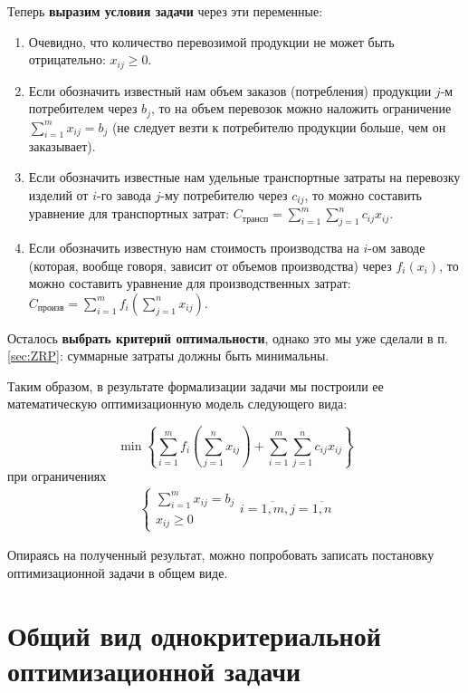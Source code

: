 \documentclass[a4paper,12pt]{report}
\begin{document}
Теперь \textbf{выразим условия задачи} через эти переменные:
\begin{enumerate}
\item Очевидно, что количество перевозимой продукции не может быть отрицательно: $x_{ij}\geq 0$.
\item Если обозначить известный нам объем заказов (потребления) продукции $j$-м потребителем через $b_{j}$, то на объем перевозок можно наложить ограничение $\sum\limits_{i=1}^m x_{ij} = b_{j}$ (не следует везти к потребителю продукции больше, чем он заказывает).
\item Если обозначить известные нам удельные транспортные затраты на перевозку изделий от $i$-го завода $j$-му потребителю через $c_{ij}$, то можно составить уравнение для транспортных затрат: $C_{\text{трансп}} = \sum\limits_{i=1}^m \sum\limits_{j=1}^n c_{ij}x_{ij}$.
\item Если обозначить известную нам стоимость производства на $i$-ом заводе (которая, вообще говоря, зависит от объемов производства) через $f_{i}(x_{i})$, то можно составить уравнение для производственных затрат: $C_{\text{произв}} = \sum\limits_{i=1}^m f_{i}(\sum\limits_{j=1}^n x_{ij})$.
\end{enumerate}
Осталось \textbf{выбрать критерий оптимальности}, однако это мы уже сделали в п. \ref{sec:ZRP}: суммарные затраты должны быть минимальны.

Таким образом, в результате формализации задачи мы построили ее математическую оптимизационную модель следующего вида:

\begin{equation}
\label{eq:num1}
\min \left\{\sum\limits_{i=1}^m f_{i}(\sum\limits_{j=1}^n x_{ij}) + \sum\limits_{i=1}^m \sum\limits_{j=1}^n c_{ij}x_{ij}\right\}
\end{equation}
при ограничениях
\begin{align}
\label{eq:num2}
\begin{cases}
\sum\limits_{i=1}^m x_{ij} = b_{j} \\
x_{ij} \geq 0
\end{cases}	
i=\overline{1,m}, j=\overline{1,n}
\end{align}

Опираясь на полученный результат, можно попробовать записать постановку оптимизационной задачи в общем виде.

\section{Общий вид однокритериальной оптимизационной задачи}
\end{document}
